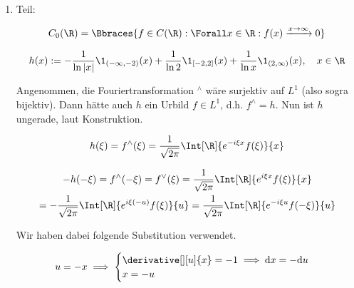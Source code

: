 \begin{solution}
\begin{enumerate}[label = \arabic*.]
    \item Teil:


    \begin{align*}
        C_0(\R)
        =
        \Bbraces
        {
            f \in C(\R):
            \Forall x \in \R:
            f(x) \xrightarrow{x \to \infty} 0
        }
    \end{align*}


    \begin{align*}
        h(x)
        :=
        -
        \frac{1}{\ln{|x|}} \1_{(-\infty, -2)}(x)
        +
        \frac{1}{\ln 2}    \1_{[-2, 2]}(x)
        +
        \frac{1}{\ln x}    \1_{(2, \infty)}(x),
        \quad
        x \in \R
    \end{align*}

    Angenommen, die Fouriertransformation $^\wedge$ wäre surjektiv auf $L^1$ (also sogra bijektiv).
    Dann hätte auch $h$ ein Urbild $f \in L^1$, d.h. $f^\wedge = h$.
    Nun ist $h$ ungerade, laut Konstruktion.

    \begin{align*}
        h(\xi)
        =
        f^\wedge(\xi)
        =
        \frac{1}{\sqrt{2 \pi}}
        \Int[\R]
        {
            e^{-i \xi x}
            f(\xi)
        }{x}
    \end{align*}

    \begin{multline*}
        -h(-\xi)
        =
        f^\wedge(-\xi)
        =
        f^\vee(\xi)
        =
        \frac{1}{\sqrt{2 \pi}}
        \Int[\R]
        {
            e^{i \xi x}
            f(\xi)
        }{x} \\
        =
        -\frac{1}{\sqrt{2 \pi}}
        \Int[\R]
        {
            e^{i \xi (-u)}
            f(\xi)
        }{u}
        =
        \frac{1}{\sqrt{2 \pi}}
        \Int[\R]
        {
            e^{-i \xi u}
            f(-\xi)
        }{u}
    \end{multline*}

    Wir haben dabei folgende Substitution verwendet.

    \begin{align*}
        u = -x
        \implies
        \begin{cases}
            \derivative[][u]{x} = -1 \implies \mathrm{d} x = -\mathrm{d} u \\
            x = -u
        \end{cases}
    \end{align*}


\end{enumerate}
\end{solution}
